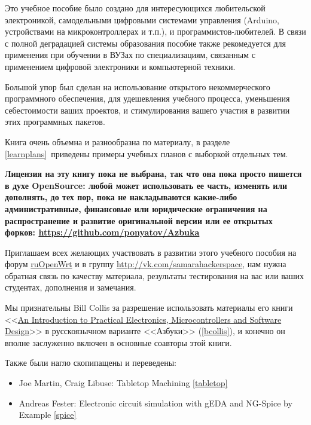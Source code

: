 
Это учебное пособие было создано для интересующихся любительской электроникой,
самодельными цифровыми системами управления (Arduino, устройствами на
микроконтроллерах и т.п.), и программистов-любителей. В связи с полной
деградацией системы образования пособие также рекомедуется для применения при
обучении в ВУЗах по специализациям, связанным с применением цифровой электроники
и компьютерной техники.

Большой упор был сделан на использование открытого некоммерческого программного
обеспечения, для удешевления учебного процесса, уменьшения себестоимости ваших
проектов, и
стимулирования вашего участия в развитии этих программных пакетов.

Книга очень объемна и разнообразна по материалу, в разделе \ref{learnplans}\
приведены примеры учебных планов с выборкой отдельных тем.

\bigskip
\textbf{Лицензия на эту книгу пока не выбрана, так что она пока просто пишется в
духе OpenSource: любой может использовать ее часть, изменять или дополнять, до
тех пор, пока не накладываются какие-либо административные, финансовые или
юридические ограничения на распространение и развитие оригинальной версии или ее
открытых форков: \url{https://github.com/ponyatov/Azbuka}}
\bigskip

Приглашаем всех желающих участвовать в развитии этого учебного пособия на форум
\href{https://groups.google.com/forum/\#!forum/openwrt2ru}{ruOpenWrt} и в группу
\url{http://vk.com/samarahackerspace}, нам нужна обратная связь по качеству
материала, результаты тестирования на вас или ваших студентах, дополнения и
замечания.
\bigskip

Мы признательны Bill Collis за разрешение использовать материалы его книги
<<\href{www.techideas.co.nz}{An Introduction to
Practical Electronics,
Microcontrollers and
Software Design}>>\cite{bcollis} в
русскоязычном варианте <<Азбуки>> (\ref{bcollis}), и конечно он вполне
заслуженно включен в основные соавторы этой книги.

\bigskip
Также были нагло скопипащены и переведены:
\begin{itemize}
  \item Joe Martin, Craig Libuse: Tabletop Machining \ref{tabletop}
  \item Andreas Fester: Electronic circuit simulation with gEDA and NG-Spice by
Example \ref{spice}
\end{itemize}
